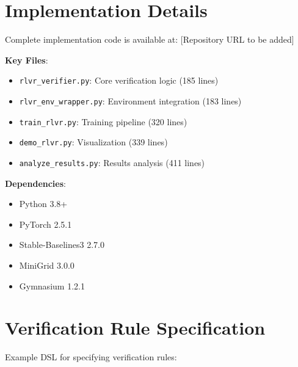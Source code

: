 \documentclass[11pt,a4paper]{article}
\begin{document}





\appendix

\section{Implementation Details}
\label{app:implementation}

Complete implementation code is available at: [Repository URL to be added]

\textbf{Key Files}:
\begin{itemize}[leftmargin=*]
    \item \texttt{rlvr\_verifier.py}: Core verification logic (185 lines)
    \item \texttt{rlvr\_env\_wrapper.py}: Environment integration (183 lines)
    \item \texttt{train\_rlvr.py}: Training pipeline (320 lines)
    \item \texttt{demo\_rlvr.py}: Visualization (339 lines)
    \item \texttt{analyze\_results.py}: Results analysis (411 lines)
\end{itemize}

\textbf{Dependencies}:
\begin{itemize}[leftmargin=*]
    \item Python 3.8+
    \item PyTorch 2.5.1
    \item Stable-Baselines3 2.7.0
    \item MiniGrid 3.0.0
    \item Gymnasium 1.2.1
\end{itemize}

\section{Verification Rule Specification}
\label{app:rules}

Example DSL for specifying verification rules:
\end{document}
